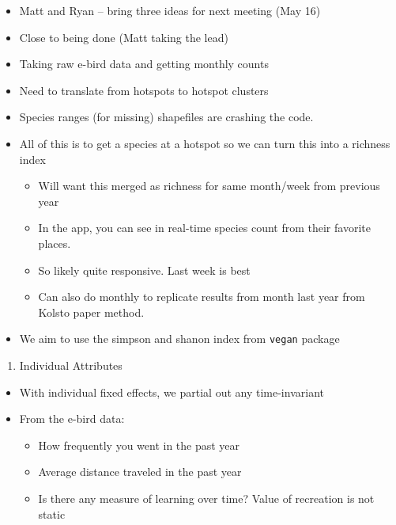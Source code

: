 \documentclass[
  letterpaper,
]{article}
\providecommand{\tightlist}{%
  \setlength{\itemsep}{0pt}\setlength{\parskip}{0pt}}\usepackage{longtable,booktabs,array}
\begin{document}
\begin{tcolorbox}
\begin{itemize}
\tightlist
\item
  Matt and Ryan -- bring three ideas for next meeting (May 16)
\item
  Close to being done (Matt taking the lead)
\item
  Taking raw e-bird data and getting monthly counts
\item
  Need to translate from hotspots to hotspot clusters
\item
  Species ranges (for missing) shapefiles are crashing the code.
\item
  All of this is to get a species at a hotspot so we can turn this into
  a richness index

  \begin{itemize}
  \tightlist
  \item
    Will want this merged as richness for same month/week from previous
    year
  \item
    In the app, you can see in real-time species count from their
    favorite places.
  \item
    So likely quite responsive. Last week is best
  \item
    Can also do monthly to replicate results from month last year from
    Kolsto paper method.
  \end{itemize}
\item
  We aim to use the simpson and shanon index from \texttt{vegan} package
\end{itemize}

\begin{enumerate}
\def\labelenumi{\arabic{enumi}.}
\setcounter{enumi}{3}
\tightlist
\item
  Individual Attributes
\end{enumerate}

\begin{itemize}
\tightlist
\item
  With individual fixed effects, we partial out any time-invariant
\item
  From the e-bird data:

  \begin{itemize}
  \tightlist
  \item
    How frequently you went in the past year
  \item
    Average distance traveled in the past year
  \item
    Is there any measure of learning over time? Value of recreation is
    not static


\end{itemize}
\end{itemize}
\end{tcolorbox}
\end{document}
